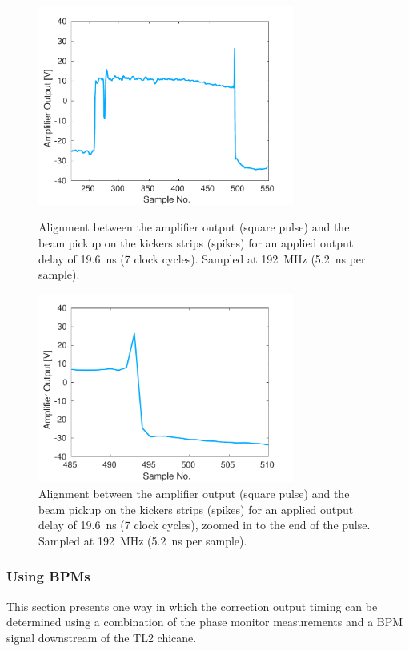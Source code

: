 \begin{figure}
  \centering
  \includegraphics[width=0.75\textwidth]{Figures/commissioning/absDelay7_all}
  \caption{Alignment between the amplifier output (square pulse) and the beam pickup on the kickers strips (spikes) for an applied output delay of 19.6~ns (7 clock cycles). Sampled at 192~MHz (5.2~ns per sample).}
  \label{f:absDelay7_all}
  \includegraphics[width=0.75\textwidth]{Figures/commissioning/absDelay7_end}
  \caption{Alignment between the amplifier output (square pulse) and the beam pickup on the kickers strips (spikes) for an applied output delay of 19.6~ns (7 clock cycles), zoomed in to the end of the pulse. Sampled at 192~MHz (5.2~ns per sample).}
  \label{f:absDelay7_end}
\end{figure}


\subsubsection{Using BPMs}
\label{sss:relativeBPM}

This section presents one way in which the correction output timing can be determined using a combination of the phase monitor measurements and a BPM signal downstream of the TL2 chicane. 

